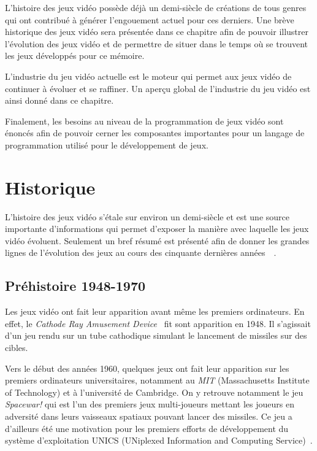 \documentclass[12pt,oneside,letterpaper,francais]{book}
\begin{document}
L'histoire des jeux vidéo possède déjà un demi-siècle de créations de
tous genres qui ont contribué à générer l'engouement actuel pour ces
derniers. Une brève historique des jeux vidéo sera présentée dans ce
chapitre afin de pouvoir illustrer l'évolution des jeux vidéo et de
permettre de situer dans le temps où se trouvent les jeux développés
pour ce mémoire.

L'industrie du jeu vidéo actuelle est le moteur qui permet aux jeux
vidéo de continuer à évoluer et se raffiner. Un aperçu global de
l'industrie du jeu vidéo est ainsi donné dans ce chapitre.

Finalement, les besoins au niveau de la programmation de jeux vidéo
sont énoncés afin de pouvoir cerner les composantes importantes pour
un langage de programmation utilisé pour le développement de jeux.


\section{Historique}

L'histoire des jeux vidéo s'étale sur environ un demi-siècle et est
une source importante d'informations qui permet d'exposer la manière
avec laquelle les jeux vidéo évoluent. Seulement un bref résumé est
présenté afin de donner les grandes lignes de l'évolution des
jeux au cours des cinquante dernières
années~\cite{VIDEOGAMES_history}~\cite{HISCORE}.


\subsection{Préhistoire 1948-1970}
Les jeux vidéo ont fait leur apparition avant même les premiers
ordinateurs. En effet, le \textit{Cathode Ray Amusement
  Device}~\cite{CRTAD} fit sont apparition en 1948. Il s'agissait d'un
jeu rendu sur un tube cathodique simulant le lancement de missiles sur
des cibles.

Vers le début des années 1960, quelques jeux ont fait leur apparition
sur les premiers ordinateurs universitaires, notamment au \textit{MIT}
(Massachusetts Institute of Technology) et à l'université de
Cambridge. On y retrouve notamment le jeu \textit{Spacewar!} qui est
l'un des premiers jeux multi-joueurs mettant les joueurs en adversité
dans leurs vaisseaux spatiaux pouvant lancer des missiles. Ce jeu a
d'ailleurs été une motivation pour les premiers efforts de
développement du système d'exploitation UNICS (UNiplexed Information
and Computing Service)~\cite{SPACEWAR-UNICS}.
\end{document}

